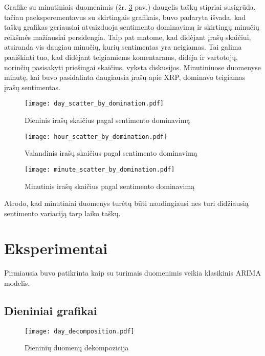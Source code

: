 \documentclass[12pt,a4paper]{article}
\begin{document}
Grafike su minutiniais duomenimis (žr. \ref{minutedom} pav.) daugelis taškų stipriai susigrūda, tačiau paeksperementavus su skirtingais grafikais, buvo padaryta išvada, kad taškų grafikas geriausiai atvaizduoja sentimento dominavimą ir skirtingų minučių reikšmės mažiausiai persidengia. Taip pat matome, kad didėjant įrašų skaičiui, atsiranda vis daugiau minučių, kurių sentimentas yra neigiamas. Tai galima paaiškinti tuo, kad didėjant teigiamiems komentarams, didėja ir vartotojų, norinčių pasisakyti priešingai skaičius, vyksta diskusijos. Minutiniuose duomenyse minutę, kai buvo pasidalinta daugiausia įrašų apie XRP, dominavo teigiamas įrašų sentimentas. 

\begin{figure}[!h]
\centering
\caption{Dieninis irašų skaičius pagal sentimento dominavimą}
\label{dailydom}
\texttt{[image: day\_scatter\_by\_domination.pdf]}
\end{figure}

\begin{figure}[!h]
\centering
\caption{Valandinis irašų skaičius pagal sentimento dominavimą}
\label{hourdom}
\texttt{[image: hour\_scatter\_by\_domination.pdf]}
\end{figure}

\begin{figure}[!h]
\centering
\caption{Minutinis irašų skaičius pagal sentimento dominavimą}
\label{minutedom}
\texttt{[image: minute\_scatter\_by\_domination.pdf]}
\end{figure}

Atrodo, kad minutiniai duomenys turėtų būti naudingiausi nes turi didžiausią sentimento variaciją tarp laiko taškų.
\clearpage
\newpage

\section{Eksperimentai}
Pirmiausia buvo patikrinta kaip su turimais duomenimis veikia klasikinis ARIMA modelis.

\subsection{Dieniniai grafikai}

\begin{figure}[!h]
\centering

\caption{Dieninių duomenų dekompozicija}
\centering
\label{daydecomp}
\texttt{[image: day\_decomposition.pdf]}
\end{figure}
\end{document}
